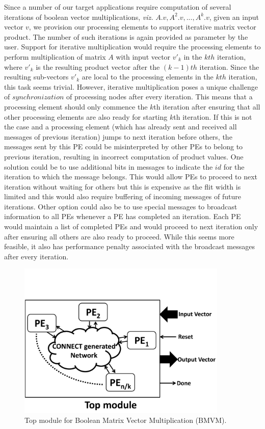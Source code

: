 \documentclass[conference, 9pt]{IEEEtran}
\begin{document}
Since a number of our target applications require computation of several iterations of boolean vector multiplications, \emph{viz.} $A.v, A^2.v, ..., A^k.v$, given an input vector $v$, we provision our processing elements to support iterative matrix vector product. The number of such iterations is again provided as parameter by the user. Support for iterative multiplication would require the processing elements to perform multiplication of matrix $A$ with input vector $v'_k$ in the $kth$ iteration, where $v'_k$ is the resulting product vector after the $(k-1)th$ iteration. Since the resulting sub-vectors $v'_k$ are local to the processing elements in the $kth$ iteration, this task seems trivial. However, iterative multiplication poses a unique challenge of $synchronization$ of processing nodes after every iteration. This means that a processing element should only commence the $k$th iteration after ensuring that all other processing elements are also ready for starting $k$th iteration. If this is not the case 
and a processing element (which has already sent and received all messages of previous iteration) jumps to next iteration before others, the messages sent by this PE could be misinterpreted by other PEs to belong to previous iteration, resulting in incorrect computation of product values. One solution could be to use additional bits in messages to indicate the $id$ for the iteration to which the message belongs. This would allow PEs to proceed to next iteration without waiting for others but this is expensive as the flit width is limited and this would also require buffering of incoming messages of future iterations. Other option could also be to use special messages to broadcast information to all PEs whenever a PE has completed an iteration. Each PE would maintain a list of completed PEs and would proceed to next iteration only after ensuring all others are also ready to proceed. While this seems more feasible, it also has performance penalty associated with the broadcast messages after every iteration.\\

\begin{figure}[t!]
\centering
\includegraphics[scale=1, width=10cm]{figs/mult_top.pdf}
\caption{Top module for Boolean Matrix Vector Multiplication (BMVM).}
\label{fig:mult_top}
\end{figure}
\end{document}
